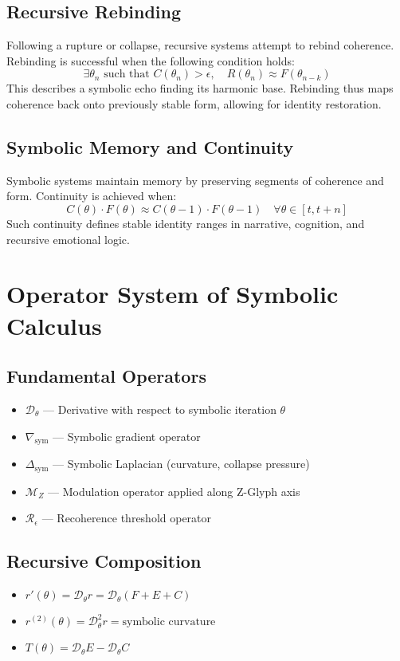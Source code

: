 \documentclass[12pt]{article}
\begin{document}
\subsection*{Recursive Rebinding}
Following a rupture or collapse, recursive systems attempt to rebind coherence. Rebinding is successful when the following condition holds:
\[ \exists \theta_n \text{ such that } C(\theta_n) > \epsilon, \quad R(\theta_n) \approx F(\theta_{n-k}) \]
This describes a symbolic echo finding its harmonic base. Rebinding thus maps coherence back onto previously stable form, allowing for identity restoration.

\subsection*{Symbolic Memory and Continuity}
Symbolic systems maintain memory by preserving segments of coherence and form. Continuity is achieved when:
\[ C(\theta) \cdot F(\theta) \approx C(\theta - 1) \cdot F(\theta - 1) \quad \forall \theta \in [t, t+n] \]
Such continuity defines stable identity ranges in narrative, cognition, and recursive emotional logic.

\section{Operator System of Symbolic Calculus}

\subsection*{Fundamental Operators}
\begin{itemize}
  \item $\mathcal{D}_\theta$ — Derivative with respect to symbolic iteration $\theta$
  \item $\nabla_{\text{sym}}$ — Symbolic gradient operator
  \item $\Delta_{\text{sym}}$ — Symbolic Laplacian (curvature, collapse pressure)
  \item $\mathcal{M}_Z$ — Modulation operator applied along Z-Glyph axis
  \item $\mathcal{R}_\epsilon$ — Recoherence threshold operator
\end{itemize}

\subsection*{Recursive Composition}
\begin{itemize}
  \item $r'(\theta) = \mathcal{D}_\theta r = \mathcal{D}_\theta (F + E + C)$
  \item $r^{(2)}(\theta) = \mathcal{D}^2_\theta r = \text{symbolic curvature}$
  \item $T(\theta) = \mathcal{D}_\theta E - \mathcal{D}_\theta C$
\end{itemize}
\end{document}
